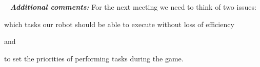 	 \newline
	\textit{\textbf{Additional comments:}} For the next meeting we need to think of two issues:
	\begin{enumerate*}
		\item which tasks our robot should be able to execute without loss of efficiency
		
		and
		
		\item to set the priorities of performing tasks during the game.
		
	\end{enumerate*}
	
	
	
	\fillpage